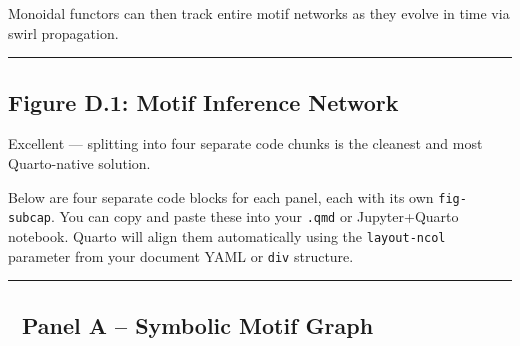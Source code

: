 \documentclass[
  11pt,
]{article}
\begin{document}
Monoidal functors can then track entire motif networks as they evolve in
time via swirl propagation.

\begin{center}\rule{0.5\linewidth}{0.5pt}\end{center}

\subsection{\texorpdfstring{\textbf{Figure D.1: Motif Inference
Network}}{Figure D.1: Motif Inference Network}}\label{figure-d.1-motif-inference-network}

Excellent --- splitting into four separate code chunks is the cleanest
and most Quarto-native solution.

Below are four separate code blocks for each panel, each with its own
\texttt{fig-subcap}. You can copy and paste these into your
\texttt{.qmd} or Jupyter+Quarto notebook. Quarto will align them
automatically using the \texttt{layout-ncol} parameter from your
document YAML or \texttt{div} structure.

\begin{center}\rule{0.5\linewidth}{0.5pt}\end{center}

\subsection{🧩 Panel A -- Symbolic Motif
Graph}\label{panel-a-symbolic-motif-graph}
\end{document}
